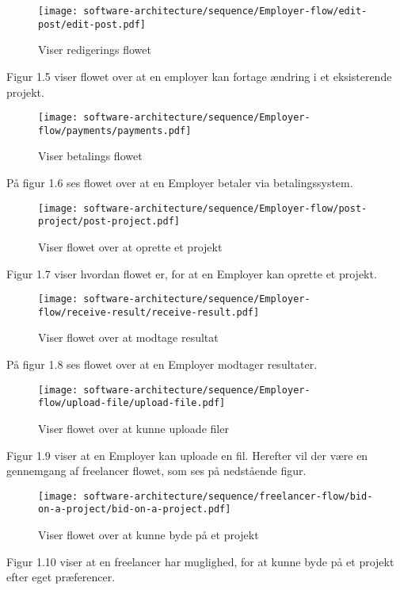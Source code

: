 \begin{figure}[ht]
    \centering
\texttt{[image: software-architecture/sequence/Employer-flow/edit-post/edit-post.pdf]}
\caption{Viser redigerings flowet}
\label{fig:figure4}
\end{figure}
Figur 1.5 viser flowet over at en employer kan fortage ændring i et eksisterende projekt.

\newpage
\begin{figure}[ht]
    \centering
\texttt{[image: software-architecture/sequence/Employer-flow/payments/payments.pdf]}
\caption{Viser betalings flowet}
\label{fig:figure4}
\end{figure}
På figur 1.6 ses flowet over at en Employer betaler via betalingssystem.

\begin{figure}[ht]
    \centering
\texttt{[image: software-architecture/sequence/Employer-flow/post-project/post-project.pdf]}
\caption{Viser flowet over at oprette et projekt}
\label{fig:figure4}
\end{figure}
Figur 1.7 viser hvordan flowet er, for at en Employer kan oprette et projekt.

\begin{figure}[ht]
    \centering
\texttt{[image: software-architecture/sequence/Employer-flow/receive-result/receive-result.pdf]}
\caption{Viser flowet over at modtage resultat}
\label{fig:figure4}
\end{figure}

På figur 1.8 ses flowet over at en Employer modtager resultater.
\newpage
\begin{figure}[ht]
    \centering
\texttt{[image: software-architecture/sequence/Employer-flow/upload-file/upload-file.pdf]}
\caption{Viser flowet over at kunne uploade filer}
\label{fig:figure4}
\end{figure}
Figur 1.9 viser at en Employer kan uploade en fil. Herefter vil der være en gennemgang af freelancer flowet, som ses på nedstående figur.

\begin{figure}[ht]
    \centering
\texttt{[image: software-architecture/sequence/freelancer-flow/bid-on-a-project/bid-on-a-project.pdf]}
\caption{Viser flowet over at kunne byde på et projekt}
\label{fig:figure4}
\end{figure}

Figur 1.10 viser at en freelancer har muglighed, for at kunne byde på et projekt efter eget præferencer.

